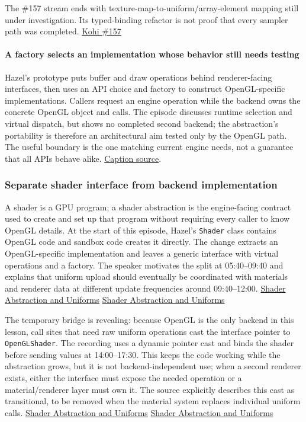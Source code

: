 The \#157 stream ends with texture-map-to-uniform/array-element mapping still under investigation. Its typed-binding refactor is not proof that every sampler path was completed. \href{https://www.youtube.com/watch?v=ZmZUmsqUN6Q}{Kohi \#157}

\paragraph{A factory selects an implementation whose behavior still needs testing}\label{a-factory-selects-an-implementation-whose-behavior-still-needs-testing}

Hazel's prototype puts buffer and draw operations behind renderer-facing interfaces, then uses an API choice and factory to construct OpenGL-specific implementations. Callers request an engine operation while the backend owns the concrete OpenGL object and calls. The episode discusses runtime selection and virtual dispatch, but shows no completed second backend; the abstraction's portability is therefore an architectural aim tested only by the OpenGL path. The useful boundary is the one matching current engine needs, not a guarantee that all APIs behave alike. \href{https://www.youtube.com/watch?v=BwCqRqqbB1Y}{Caption source}.

\subsubsection{Separate shader interface from backend implementation}\label{separate-shader-interface-from-backend-implementation}

A shader is a GPU program; a shader abstraction is the engine-facing contract used to create and set up that program without requiring every caller to know OpenGL details. At the start of this episode, Hazel's \texttt{Shader} class contains OpenGL code and sandbox code creates it directly. The change extracts an OpenGL-specific implementation and leaves a generic interface with virtual operations and a factory. The speaker motivates the split at 05:40--09:40 and explains that uniform upload should eventually be coordinated with materials and renderer data at different update frequencies around 09:40--12:00. \href{https://www.youtube.com/watch?v=d5wL6eZnWMU&t=340s}{Shader Abstraction and Uniforms} \href{https://www.youtube.com/watch?v=d5wL6eZnWMU&t=580s}{Shader Abstraction and Uniforms}

The temporary bridge is revealing: because OpenGL is the only backend in this lesson, call sites that need raw uniform operations cast the interface pointer to \texttt{OpenGLShader}. The recording uses a dynamic pointer cast and binds the shader before sending values at 14:00--17:30. This keeps the code working while the abstraction grows, but it is not backend-independent use; when a second renderer exists, either the interface must expose the needed operation or a material/renderer layer must own it. The source explicitly describes this cast as transitional, to be removed when the material system replaces individual uniform calls. \href{https://www.youtube.com/watch?v=d5wL6eZnWMU&t=840s}{Shader Abstraction and Uniforms} \href{https://www.youtube.com/watch?v=d5wL6eZnWMU&t=960s}{Shader Abstraction and Uniforms}

